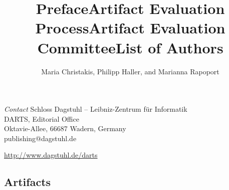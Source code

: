 \documentclass[a4paper,UKenglish]{dartsmaster}
\begin{document}
\begin{publicationinfo}
\bigskip
\emph{Contact}\newline
Schloss Dagstuhl -- Leibniz-Zentrum f\"ur Informatik\\
DARTS, Editorial Office\\
Oktavie-Allee, 66687 Wadern, Germany\\ 
publishing@dagstuhl.de


\bigskip

\url{http://www.dagstuhl.de/darts}
 
 \thispagestyle{empty}
 \onecolumn

\newpage

\end{publicationinfo}




\begin{contentslist}

\contitem
\title{Preface}
\author{Maria Christakis, Philipp Haller, and Marianna Rapoport}

\contitem
\title{Artifact Evaluation Process}
\author{ }

\contitem
\title{Artifact Evaluation Committee}
\author{ }

\contitem
\title{List of Authors}
\author{ }

\part{Artifacts}



\end{contentslist}
\end{document}
